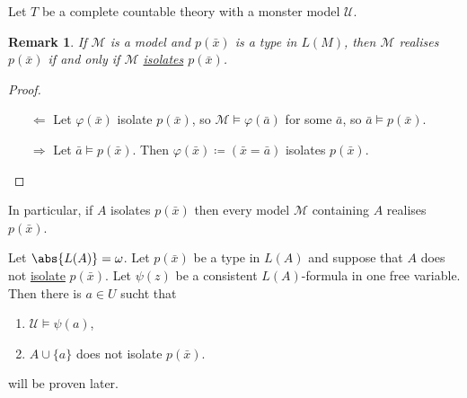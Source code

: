 \documentclass{article}
\let\models\vDash
\newtheorem{nremark}[nthm]{Remark}
\newcommand{\named}[1]{\textbf{#1}\index{#1}}
\newcommand{\M}{\mathcal{M}}
\newcommand{\U}{\mathcal{U}}
\begin{document}
Let $T$ be a complete countable theory with a monster model $\U$.


\begin{nremark} \label{rem:9.2}
If $\M$ is a model and $p(\bar x)$ is a type in $L(M)$, then $\M$ realises $p(\bar x)$ if and only if $\M$ \hyperlink{def:isolate}{isolates} $p(\bar x)$.
\end{nremark}

\begin{proof}
\begin{itemize}
\item[$\Leftarrow$] Let $\varphi(\bar x)$ isolate $p(\bar x)$, so $\M \models \varphi(\bar a)$ for some $\bar{a}$, so $\bar{a} \models p(\bar x)$.
\item[$\Rightarrow$] Let $\bar a \models p(\bar x)$. Then $\varphi(\bar x) \coloneqq (\bar x = \bar a)$ isolates $p(\bar x)$. \qedhere
\end{itemize}
\end{proof}

In particular, if $A$ isolates $p(\bar x)$ then every model $\mathcal{M}$ containing $A$ realises $p(\bar x)$.

\begin{nlemma} \label{lemma:9.3}
Let $\abs{L(A)} = \omega$. Let $p(\bar{x})$ be a type in $L(A)$ and suppose that $A$ does not \hyperlink{def:isolate}{isolate} $p(\bar x)$. Let $\psi(z)$ be a consistent $L(A)$-formula in one free variable. Then there is $a \in U$ sucht that
\begin{enumerate}[label=(\roman*)]
\item $\U \models \psi(a)$,
\item $A \cup \{a\}$ does not isolate $p(\bar x)$.
\end{enumerate}
\end{nlemma}
 will be proven later.
\end{document}
